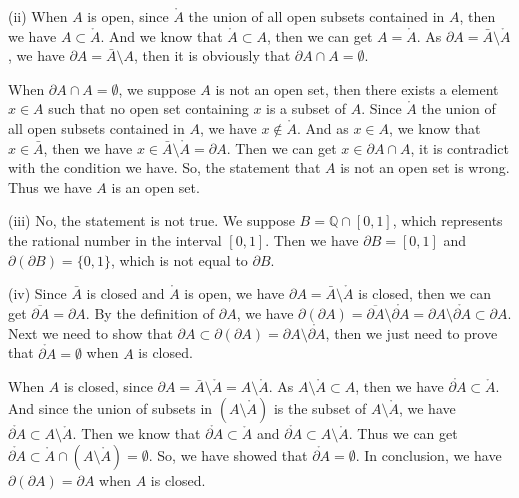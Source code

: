\documentclass[12pt,a4paper]{ctexart}
\begin{document}
(ii) When $A$ is open, since $\mathring{A}$ the union of all open subsets contained in $A$, then we have $A \subset \mathring {A}$. And we know that $\mathring{A} \subset A$, then we can get $A = \mathring{A}$. As $\partial A = \bar{A} \setminus \mathring{A} $, we have $\partial A = \bar{A} \setminus A $, then it is obviously that $\partial A \cap  A  = \emptyset$.

When $\partial A \cap A = \emptyset$, we suppose $A$ is not an open set, then there exists a element $x \in A$ such that no open set containing $x$ is a subset of $A$. Since $\mathring{A}$ the union of all open subsets contained in $A$, we have $x \notin \mathring{A}$. And as $x \in A$, we know that $x \in \bar{A}$, then we have $x \in \bar{A} \setminus \mathring{A} = \partial A$. Then we can get $x \in  \partial A \cap A $, it is contradict with the condition we have. So, the statement that $A$ is not an open set is wrong. Thus we have $A$ is an open set.

(iii) No, the statement is not true. We suppose $B = \mathbb{Q} \cap [0, 1]$, which represents the rational number in the interval $[0, 1]$. Then we have $\partial B = [0, 1]$ and $\partial (\partial B) = \{0, 1\}$, which is not equal to $\partial B$.

(iv) Since $\bar{A}$ is closed and $\mathring{A}$ is open, we have $\partial A = \bar{A} \setminus \mathring{A} $ is closed, then we can get $\overline{\partial A} = \partial A$. By the definition of $\partial A$, we have $\partial (\partial A) = \overline{\partial A} \setminus \mathring{\partial A} = \partial A \setminus \mathring{\partial A} \subset \partial A$. Next we need to show that $\partial A \subset \partial (\partial A) = \partial A \setminus \mathring{\partial A}$, then we just need to prove that $\mathring{\partial A} = \emptyset$ when $A$ is closed. 

When $A$ is closed, since $\partial A = \bar{A} \setminus \mathring{A} = A \setminus \mathring{A}$. As $A \setminus \mathring{A} \subset A$, then we have $\mathring{\partial A} \subset \mathring{A}$. And since the union of subsets in $(A \setminus \mathring{A})$ is the subset of $ A \setminus \mathring{A}$, we have $\mathring{\partial A} \subset A \setminus \mathring{A}$. Then we know that $\mathring{\partial A} \subset \mathring{A}$ and $\mathring{\partial A} \subset A \setminus \mathring{A}$. Thus we can get $\mathring{\partial A} \subset \mathring{A} \cap (A \setminus \mathring{A}) = \emptyset$. So, we have showed that $\mathring{\partial A} = \emptyset$. In conclusion, we have $\partial(\partial A) = \partial A$ when $A$ is closed.
\end{document}

